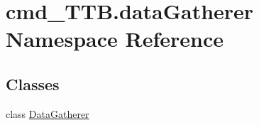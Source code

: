 \hypertarget{namespacecmd__TTB_1_1dataGatherer}{}\section{cmd\+\_\+\+T\+T\+B.\+data\+Gatherer Namespace Reference}
\label{namespacecmd__TTB_1_1dataGatherer}
\subsection*{Classes}
\begin{DoxyCompactItemize}
\item 
class \hyperlink{classcmd__TTB_1_1dataGatherer_1_1DataGatherer}{Data\+Gatherer}
\end{DoxyCompactItemize}
